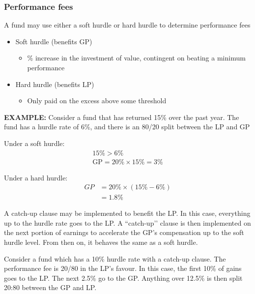 \documentclass[../notes_compiled.tex]{subfiles}
\begin{document}
\subsubsection{Performance fees}
\begin{itemize}
\item A fund may use either a soft hurdle or hard hurdle to determine performance fees
\begin{itemize}
\item Soft hurdle (benefits GP)
\begin{itemize}
\item \% increase in the investment of value, contingent on beating a minimum performance
\end{itemize}
\item Hard hurdle (benefits LP)
\begin{itemize}
\item Only paid on the excess above some threshold
\end{itemize}
\end{itemize}
{\color{RedViolet}
\item[] \textbf{EXAMPLE:} Consider a fund that has returned 15\% over the past year. The fund has a hurdle rate of 6\%, and there is an 80/20 split between the LP and GP
}
\begin{itemize}
{\color{RoyalBlue}
\begin{multicols}{2}
\item Under a soft hurdle:
\begin{gather*}
15\%>6\% \\
\text{GP}=20\% \times 15\% = 3\%
\end{gather*}
\item Under a hard hurdle:
\begin{align*}
GP&=20\%\times(15\%-6\%)\\
&=1.8\%
\end{align*}
\end{multicols}
}
\end{itemize}
\item A catch-up clause may be implemented to benefit the LP. In this case, everything up to the hurdle rate goes to the LP. A ``catch-up’’ clause is then implemented on the next portion of earnings to accelerate the GP’s compensation up to the soft hurdle level. From then on, it behaves the same as a soft hurdle.
{\color{RedViolet}
\item Consider a fund which has a 10\% hurdle rate with a catch-up clause. The performance fee is 20/80 in the LP’s favour. In this case, the first 10\% of gains goes to the LP. The next 2.5\% go to the GP. Anything over 12.5\% is then split 20:80 between the GP and LP.
}
\end{itemize}
\end{document}
